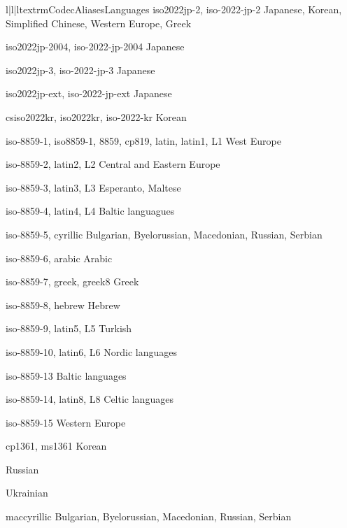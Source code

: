 \begin{longtableiii}{l|l|l}{textrm}{Codec}{Aliases}{Languages}
        {iso2022jp-2, iso-2022-jp-2}
        {Japanese, Korean, Simplified Chinese, Western Europe, Greek}

        {iso2022jp-2004, iso-2022-jp-2004}
        {Japanese}

        {iso2022jp-3, iso-2022-jp-3}
        {Japanese}

        {iso2022jp-ext, iso-2022-jp-ext}
        {Japanese}

        {csiso2022kr, iso2022kr, iso-2022-kr}
        {Korean}

        {iso-8859-1, iso8859-1, 8859, cp819, latin, latin1, L1}
        {West Europe}

        {iso-8859-2, latin2, L2}
        {Central and Eastern Europe}

        {iso-8859-3, latin3, L3}
        {Esperanto, Maltese}

        {iso-8859-4, latin4, L4}
        {Baltic languagues}

        {iso-8859-5, cyrillic}
        {Bulgarian, Byelorussian, Macedonian, Russian, Serbian}

        {iso-8859-6, arabic}
        {Arabic}

        {iso-8859-7, greek, greek8}
        {Greek}

        {iso-8859-8, hebrew}
        {Hebrew}

        {iso-8859-9, latin5, L5}
        {Turkish}

        {iso-8859-10, latin6, L6}
        {Nordic languages}

        {iso-8859-13}
        {Baltic languages}

        {iso-8859-14, latin8, L8}
        {Celtic languages}

        {iso-8859-15}
        {Western Europe}

        {cp1361, ms1361}
        {Korean}

        {}
        {Russian}

        {}
        {Ukrainian}

        {maccyrillic}
        {Bulgarian, Byelorussian, Macedonian, Russian, Serbian}


\end{longtableiii}
